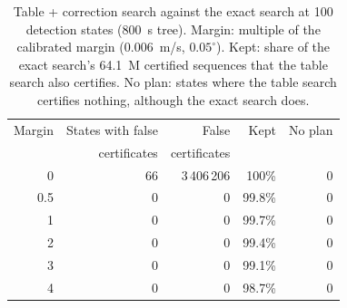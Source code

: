 \documentclass[11pt,a4paper]{article}
\begin{document}
\begin{table}[htbp]
\centering
\caption{Table + correction search against the exact search at 100 detection
states (800~s tree). Margin: multiple of the calibrated margin (0.006~m/s,
$0.05^\circ$). Kept: share of the exact search's 64.1~M certified sequences
that the table search also certifies. No plan: states where the table search
certifies nothing, although the exact search does.}
\label{tab:soundness}
\small
\begin{tabular}{@{}rrrrr@{}}
\toprule
Margin & States with false & False & Kept & No plan \\
       & certificates      & certificates & & \\
\midrule
0    & 66 & 3\,406\,206 & 100\%  & 0 \\
0.5  & 0  & 0           & 99.8\% & 0 \\
1    & 0  & 0           & 99.7\% & 0 \\
2    & 0  & 0           & 99.4\% & 0 \\
3    & 0  & 0           & 99.1\% & 0 \\
4    & 0  & 0           & 98.7\% & 0 \\
\bottomrule
\end{tabular}
\end{table}
\end{document}
